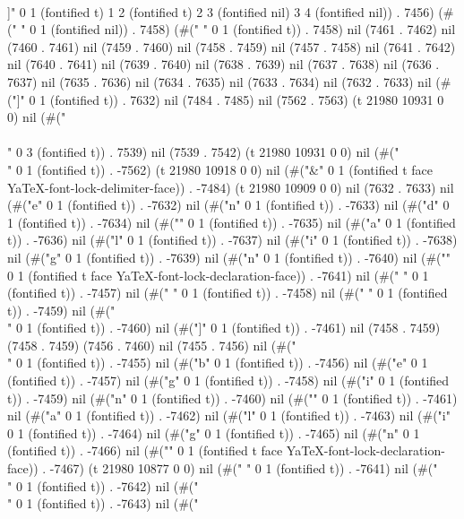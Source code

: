 \\]" 0 1 (fontified t) 1 2 (fontified t) 2 3 (fontified nil) 3 4 (fontified nil)) . 7456) (#("
" 0 1 (fontified nil)) . 7458) (#(" " 0 1 (fontified t)) . 7458) nil (7461 . 7462) nil (7460 . 7461) nil (7459 . 7460) nil (7458 . 7459) nil (7457 . 7458) nil (7641 . 7642) nil (7640 . 7641) nil (7639 . 7640) nil (7638 . 7639) nil (7637 . 7638) nil (7636 . 7637) nil (7635 . 7636) nil (7634 . 7635) nil (7633 . 7634) nil (7632 . 7633) nil (#("]" 0 1 (fontified t)) . 7632) nil (7484 . 7485) nil (7562 . 7563) (t 21980 10931 0 0) nil (#(" \\\\" 0 3 (fontified t)) . 7539) nil (7539 . 7542) (t 21980 10931 0 0) nil (#("\\" 0 1 (fontified t)) . -7562) (t 21980 10918 0 0) nil (#("&" 0 1 (fontified t face YaTeX-font-lock-delimiter-face)) . -7484) (t 21980 10909 0 0) nil (7632 . 7633) nil (#("e" 0 1 (fontified t)) . -7632) nil (#("n" 0 1 (fontified t)) . -7633) nil (#("d" 0 1 (fontified t)) . -7634) nil (#("{" 0 1 (fontified t)) . -7635) nil (#("a" 0 1 (fontified t)) . -7636) nil (#("l" 0 1 (fontified t)) . -7637) nil (#("i" 0 1 (fontified t)) . -7638) nil (#("g" 0 1 (fontified t)) . -7639) nil (#("n" 0 1 (fontified t)) . -7640) nil (#("}" 0 1 (fontified t face YaTeX-font-lock-declaration-face)) . -7641) nil (#("
" 0 1 (fontified t)) . -7457) nil (#(" " 0 1 (fontified t)) . -7458) nil (#("
" 0 1 (fontified t)) . -7459) nil (#("\\" 0 1 (fontified t)) . -7460) nil (#("]" 0 1 (fontified t)) . -7461) nil (7458 . 7459) (7458 . 7459) (7456 . 7460) nil (7455 . 7456) nil (#("\\" 0 1 (fontified t)) . -7455) nil (#("b" 0 1 (fontified t)) . -7456) nil (#("e" 0 1 (fontified t)) . -7457) nil (#("g" 0 1 (fontified t)) . -7458) nil (#("i" 0 1 (fontified t)) . -7459) nil (#("n" 0 1 (fontified t)) . -7460) nil (#("{" 0 1 (fontified t)) . -7461) nil (#("a" 0 1 (fontified t)) . -7462) nil (#("l" 0 1 (fontified t)) . -7463) nil (#("i" 0 1 (fontified t)) . -7464) nil (#("g" 0 1 (fontified t)) . -7465) nil (#("n" 0 1 (fontified t)) . -7466) nil (#("}" 0 1 (fontified t face YaTeX-font-lock-declaration-face)) . -7467) (t 21980 10877 0 0) nil (#(" " 0 1 (fontified t)) . -7641) nil (#("\\" 0 1 (fontified t)) . -7642) nil (#("\\" 0 1 (fontified t)) . -7643) nil (#("
